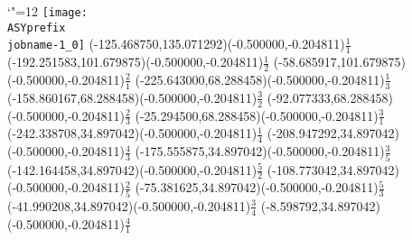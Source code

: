 \setlength{\unitlength}{1pt}%
\makeatletter%
\let\ASYencoding\f@encoding%
\let\ASYfamily\f@family%
\let\ASYseries\f@series%
\let\ASYshape\f@shape%
\makeatother%
{\catcode`"=12%
\texttt{[image: \\ASYprefix\\jobname-1\_0]}%
}%
\color{ASYcolor}%
\fontsize{12.000000}{14.400000}\selectfont%
\usefont{\ASYencoding}{\ASYfamily}{\ASYseries}{\ASYshape}%
\ASYalign(-125.468750,135.071292)(-0.500000,-0.204811){$\frac{1}{1}$}%
\color{ASYcolor}%
\fontsize{12.000000}{14.400000}\selectfont%
\ASYalign(-192.251583,101.679875)(-0.500000,-0.204811){$\frac{1}{2}$}%
\color{ASYcolor}%
\fontsize{12.000000}{14.400000}\selectfont%
\ASYalign(-58.685917,101.679875)(-0.500000,-0.204811){$\frac{2}{1}$}%
\color{ASYcolor}%
\fontsize{12.000000}{14.400000}\selectfont%
\ASYalign(-225.643000,68.288458)(-0.500000,-0.204811){$\frac{1}{3}$}%
\color{ASYcolor}%
\fontsize{12.000000}{14.400000}\selectfont%
\ASYalign(-158.860167,68.288458)(-0.500000,-0.204811){$\frac{3}{2}$}%
\color{ASYcolor}%
\fontsize{12.000000}{14.400000}\selectfont%
\ASYalign(-92.077333,68.288458)(-0.500000,-0.204811){$\frac{2}{3}$}%
\color{ASYcolor}%
\fontsize{12.000000}{14.400000}\selectfont%
\ASYalign(-25.294500,68.288458)(-0.500000,-0.204811){$\frac{3}{1}$}%
\color{ASYcolor}%
\fontsize{12.000000}{14.400000}\selectfont%
\ASYalign(-242.338708,34.897042)(-0.500000,-0.204811){$\frac{1}{4}$}%
\color{ASYcolor}%
\fontsize{12.000000}{14.400000}\selectfont%
\ASYalign(-208.947292,34.897042)(-0.500000,-0.204811){$\frac{4}{3}$}%
\color{ASYcolor}%
\fontsize{12.000000}{14.400000}\selectfont%
\ASYalign(-175.555875,34.897042)(-0.500000,-0.204811){$\frac{3}{5}$}%
\color{ASYcolor}%
\fontsize{12.000000}{14.400000}\selectfont%
\ASYalign(-142.164458,34.897042)(-0.500000,-0.204811){$\frac{5}{2}$}%
\color{ASYcolor}%
\fontsize{12.000000}{14.400000}\selectfont%
\ASYalign(-108.773042,34.897042)(-0.500000,-0.204811){$\frac{2}{5}$}%
\color{ASYcolor}%
\fontsize{12.000000}{14.400000}\selectfont%
\ASYalign(-75.381625,34.897042)(-0.500000,-0.204811){$\frac{5}{3}$}%
\color{ASYcolor}%
\fontsize{12.000000}{14.400000}\selectfont%
\ASYalign(-41.990208,34.897042)(-0.500000,-0.204811){$\frac{3}{4}$}%
\color{ASYcolor}%
\fontsize{12.000000}{14.400000}\selectfont%
\ASYalign(-8.598792,34.897042)(-0.500000,-0.204811){$\frac{4}{1}$}%
